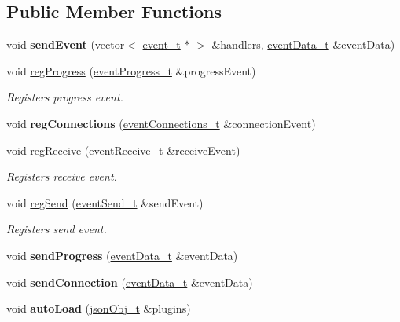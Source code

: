 \subsection*{\-Public \-Member \-Functions}
\begin{DoxyCompactItemize}
\item 
\hypertarget{classeventSink__t_a3f62b9ded6e0d2f3f24de68ba895e496}{void {\bfseries send\-Event} (vector$<$ \hyperlink{classevent__t}{event\-\_\-t} $\ast$ $>$ \&handlers, \hyperlink{classeventData__t}{event\-Data\-\_\-t} \&event\-Data)}\label{classeventSink__t_a3f62b9ded6e0d2f3f24de68ba895e496}

\item 
void \hyperlink{classeventSink__t_a7339c49521260767b8fe4f916b537530}{reg\-Progress} (\hyperlink{classeventProgress__t}{event\-Progress\-\_\-t} \&progress\-Event)
\begin{DoxyCompactList}\small\item\em \-Registers progress event. \end{DoxyCompactList}\item 
\hypertarget{classeventSink__t_abdaba9df57257931847ef02afd358b66}{void {\bfseries reg\-Connections} (\hyperlink{classeventConnections__t}{event\-Connections\-\_\-t} \&connection\-Event)}\label{classeventSink__t_abdaba9df57257931847ef02afd358b66}

\item 
void \hyperlink{classeventSink__t_a23bbd3acc81245047d7e75befdb0b828}{reg\-Receive} (\hyperlink{classeventReceive__t}{event\-Receive\-\_\-t} \&receive\-Event)
\begin{DoxyCompactList}\small\item\em \-Registers receive event. \end{DoxyCompactList}\item 
void \hyperlink{classeventSink__t_aba491c989268123534c707dc9abdd2aa}{reg\-Send} (\hyperlink{classeventSend__t}{event\-Send\-\_\-t} \&send\-Event)
\begin{DoxyCompactList}\small\item\em \-Registers send event. \end{DoxyCompactList}\item 
\hypertarget{classeventSink__t_ab8a23cd49cbd44bef337f53fc85a2c15}{void {\bfseries send\-Progress} (\hyperlink{classeventData__t}{event\-Data\-\_\-t} \&event\-Data)}\label{classeventSink__t_ab8a23cd49cbd44bef337f53fc85a2c15}

\item 
\hypertarget{classeventSink__t_a6ec6a2f0953773fff74ff1bc3eb90ad7}{void {\bfseries send\-Connection} (\hyperlink{classeventData__t}{event\-Data\-\_\-t} \&event\-Data)}\label{classeventSink__t_a6ec6a2f0953773fff74ff1bc3eb90ad7}

\item 
\hypertarget{classeventSink__t_af4d67490d4080a6f8d7bd3379be6c27d}{void {\bfseries auto\-Load} (\hyperlink{classjsonObj__t}{json\-Obj\-\_\-t} \&plugins)}\label{classeventSink__t_af4d67490d4080a6f8d7bd3379be6c27d}

\end{DoxyCompactItemize}
